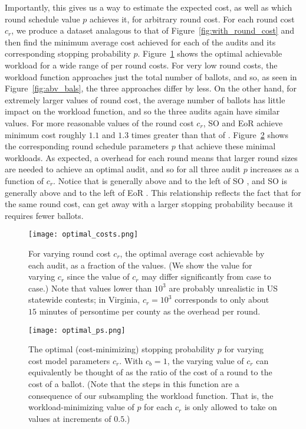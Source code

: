Importantly, this gives us a way to estimate the expected cost, as well as which round schedule value $p$ achieves it, for arbitrary round cost. For each round cost $c_r$, we produce a dataset analagous to that of Figure~\ref{fig:with_round_cost} and then find the minimum average cost achieved for each of the audits and its corresponding stopping probability $p$. 
Figure~\ref{fig:optimal_costs} shows the optimal achievable workload for a wide range of per round costs. For very low round costs, the workload function approaches just the total number of ballots, and so, as seen in Figure~\ref{fig:abv_bals}, the three approaches differ by less. On the other hand, for extremely larger values of round cost, the average number of ballots has little impact on the workload function, and so the three audits again have similar values. For more reasonable values of the round cost $c_r$, SO \BRAVO and EoR \BRAVO achieve minimum cost roughly $1.1$ and $1.3$ times greater than that of \Providence.
Figure~\ref{fig:optimal_ps} shows the corresponding round schedule parameters $p$ that achieve these minimal workloads. As expected, a overhead for each round means that larger round sizes are needed to achieve an optimal audit, and so for all three audit $p$ increases as a function of $c_r$. Notice that \Providence is generally above and to the left of SO \BRAVO, and SO \BRAVO is generally above and to the left of EoR \BRAVO. This relationship reflects the fact that for the same round cost, \Providence can get away with a larger stopping probability because it requires fewer ballots.

\begin{figure}
\texttt{[image: optimal\_costs.png]}
\caption{For varying round cost $c_r$, the optimal average cost achievable by each audit, as a fraction of the \Providence values. (We show the value for varying $c_r$ since the value of $c_r$ may differ significantly from case to case.) Note that values lower than $10^3$ are probably unrealistic in US statewide contests; in Virginia, $c_r=10^3$ corresponds to only about $15$ minutes of persontime per county as the overhead per round.}
\label{fig:optimal_costs}
\end{figure}

\begin{figure}
\texttt{[image: optimal\_ps.png]}
\caption{The optimal (cost-minimizing) stopping probability $p$ for varying cost model parameters $c_r$. With $c_b=1$, the varying value of $c_r$ can equivalently be thought of as the ratio of the cost of a round to the cost of a ballot. (Note that the steps in this function are a consequence of our subsampling the workload function. That is, the workload-minimizing value of $p$ for each $c_r$ is only allowed to take on values at increments of $0.5$.)}
\label{fig:optimal_ps}
\end{figure}


